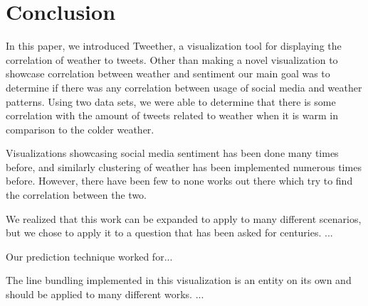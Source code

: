 \section{Conclusion}

In this paper, we introduced Tweether, a visualization tool for displaying the correlation of weather to tweets. Other than making a novel visualization to showcase correlation between weather and sentiment our main goal was to determine if there was any correlation between usage of social media and weather patterns. Using two data sets, we were able to determine that there is some correlation with the amount of tweets related to weather when it is warm in comparison to the colder weather.

Visualizations showcasing social media sentiment has been done many times before, and similarly clustering of weather has been implemented numerous times before. However, there have been few to none works out there which try to find the correlation between the two.

We realized that this work can be expanded to apply to many different scenarios, but we chose to apply it to a question that has been asked for centuries. ...

Our prediction technique worked for...

The line bundling implemented in this visualization is an entity on its own and should be applied to many different works. ...